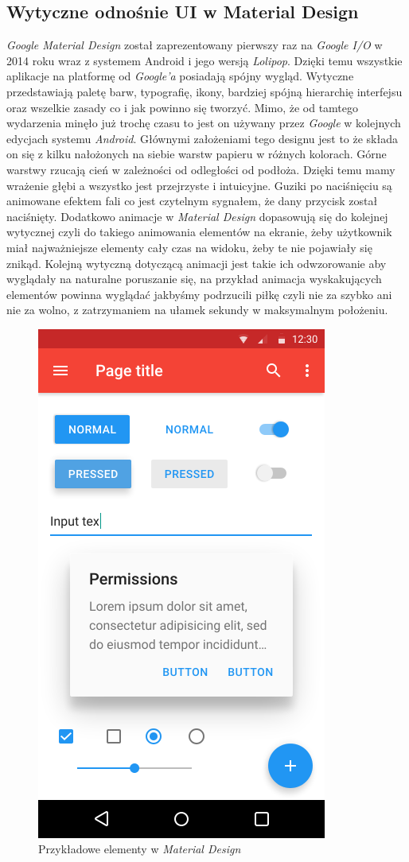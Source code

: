 \documentclass[openright]{xmgr}
\begin{document}
\subsection{Wytyczne odnośnie UI w Material Design}
\textit{Google Material Design} został zaprezentowany pierwszy raz na \textit{Google I/O }w 2014 roku wraz z systemem Android i jego wersją \textit{Lolipop}.  Dzięki temu wszystkie aplikacje na platformę od \textit{Google’a} posiadają spójny wygląd. Wytyczne przedstawiają paletę barw, typografię, ikony, bardziej spójną hierarchię interfejsu oraz wszelkie zasady co i jak powinno się tworzyć. Mimo, że od tamtego wydarzenia minęło już trochę czasu to jest on używany przez \textit{Google} w kolejnych edycjach systemu \textit{Android}. Głównymi założeniami tego designu jest to że składa on się z kilku  nałożonych na siebie warstw papieru w różnych kolorach. Górne warstwy rzucają cień w zależności od odległości od podłoża. Dzięki temu mamy wrażenie głębi a wszystko jest przejrzyste i intuicyjne. Guziki  po naciśnięciu są animowane efektem fali co jest czytelnym sygnałem, że dany przycisk został naciśnięty. Dodatkowo animacje w \textit{Material Design} dopasowują się do kolejnej wytycznej czyli do takiego animowania elementów na ekranie, żeby użytkownik miał najważniejsze elementy cały czas na widoku, żeby te nie pojawiały się znikąd. Kolejną wytyczną dotyczącą animacji jest takie ich odwzorowanie aby wyglądały na naturalne poruszanie się, na przykład animacja wyskakujących elementów powinna wyglądać jakbyśmy podrzucili piłkę czyli nie za szybko ani nie za wolno, z zatrzymaniem na ułamek sekundy w maksymalnym położeniu.  
\begin{figure}[H]
\centering
\includegraphics[width=0.5\hsize]{images/Material_Design_example.png}
\caption{Przykładowe elementy w \textit{Material Design}\label{RYS.1}}
\end{figure}
\end{document}
